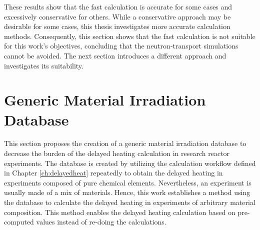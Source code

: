 These results show that the fast calculation is accurate for some cases and excessively conservative for others.
While a conservative approach may be desirable for some cases, this thesis investigates more accurate calculation methods.
Consequently, this section shows that the fast calculation is not suitable for this work's objectives, concluding that the neutron-transport simulations cannot be avoided.
The next section introduces a different approach and investigates its suitability.


\section{Generic Material Irradiation Database}
\label{sec:irradatabase}

This section proposes the creation of a generic material irradiation database to decrease the burden of the delayed heating calculation in research reactor experiments.
The database is created by utilizing the calculation workflow defined in Chapter \ref{ch:delayedheat} repeatedly to obtain the delayed heating in experiments composed of pure chemical elements.
Nevertheless, an experiment is usually made of a mix of materials.
Hence, this work establishes a method using the database to calculate the delayed heating in experiments of arbitrary material composition.
This method enables the delayed heating calculation based on pre-computed values instead of re-doing the calculations.


